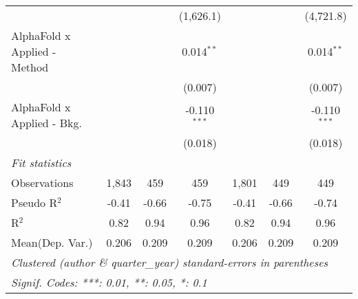 \begin{tabular}{lcccccc}
                                &              &           & (1,626.1)      &              &           & (4,721.8)\\   
   AlphaFold x Applied - Method &              &           & 0.014$^{**}$   &              &           & 0.014$^{**}$\\   
                                &              &           & (0.007)        &              &           & (0.007)\\   
   AlphaFold x Applied - Bkg.   &              &           & -0.110$^{***}$ &              &           & -0.110$^{***}$\\   
                                &              &           & (0.018)        &              &           & (0.018)\\   
   \midrule
   \emph{Fit statistics}\\
   Observations                 & 1,843        & 459       & 459            & 1,801        & 449       & 449\\  
   Pseudo R$^2$                 & -0.41        & -0.66     & -0.75          & -0.41        & -0.66     & -0.74\\  
   R$^2$                        & 0.82         & 0.94      & 0.96           & 0.82         & 0.94      & 0.96\\  
Mean(Dep. Var.) & 0.206 & 0.209 & 0.209 & 0.206 & 0.209 & 0.209 \\
   \midrule \midrule
   \multicolumn{7}{l}{\emph{Clustered (author \& quarter\_year) standard-errors in parentheses}}\\
   \multicolumn{7}{l}{\emph{Signif. Codes: ***: 0.01, **: 0.05, *: 0.1}}\\
\end{tabular}
\par\endgroup

